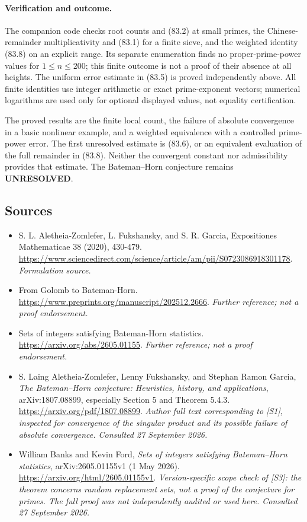 \documentclass[11pt]{article}
\begin{document}
\paragraph{Verification and outcome.}
The companion code checks root counts and (83.2) at small primes, the
Chinese-remainder multiplicativity and (83.1) for a finite sieve, and the
weighted identity (83.8) on an explicit range. Its separate enumeration
finds no proper-prime-power values for $1\leq n\leq200$; this finite
outcome is not a proof of their absence at all heights. The uniform
error estimate in (83.5) is proved independently above. All finite identities use integer arithmetic
or exact prime-exponent vectors; numerical logarithms are used only for
optional displayed values, not equality certification.

The proved results are the finite local count, the failure of absolute
convergence in a basic nonlinear example, and a weighted equivalence
with a controlled prime-power error. The first unresolved estimate is
(83.6), or an equivalent evaluation of the full remainder in (83.8).
Neither the convergent constant nor admissibility provides that estimate.
The Bateman--Horn conjecture remains \textbf{UNRESOLVED}.

\subsection{Sources}
\begin{itemize}
\item[S1]S. L. Aletheia-Zomlefer, L. Fukshansky, and S. R. Garcia, Expositiones Mathematicae 38 (2020), 430-479.
\url{https://www.sciencedirect.com/science/article/am/pii/S0723086918301178}.
\textit{Formulation source.}
\item[S2]From Golomb to Bateman-Horn.
\url{https://www.preprints.org/manuscript/202512.2666}.
\textit{Further reference; not a proof endorsement.}
\item[S3]Sets of integers satisfying Bateman-Horn statistics.
\url{https://arxiv.org/abs/2605.01155}.
\textit{Further reference; not a proof endorsement.}

\item[E1]S. Laing Aletheia-Zomlefer, Lenny Fukshansky, and Stephan Ramon
Garcia, \emph{The Bateman--Horn conjecture: Heuristics, history, and
applications}, arXiv:1807.08899, especially Section 5 and Theorem 5.4.3.
\url{https://arxiv.org/pdf/1807.08899}.
\textit{Author full text corresponding to [S1], inspected for convergence
of the singular product and its possible failure of absolute convergence.
Consulted 27 September 2026.}
\item[E2]William Banks and Kevin Ford, \emph{Sets of integers satisfying
Bateman--Horn statistics}, arXiv:2605.01155v1 (1 May 2026).
\url{https://arxiv.org/html/2605.01155v1}.
\textit{Version-specific scope check of [S3]: the theorem concerns random
replacement sets, not a proof of the conjecture for primes. The full proof
was not independently audited or used here. Consulted 27 September 2026.}
\end{itemize}
\end{document}
